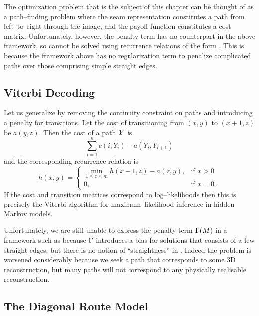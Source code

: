 The optimization problem that is the subject of this chapter can be
thought of as a path--finding problem where the seam representation
constitutes a path from left--to--right through the image, and the
payoff function constitutes a cost matrix. Unfortunately, however, the
penalty term has no counterpart in the above framework, so
 cannot be solved using recurrence relations of the
form . This is because the framework above has no
regularization term to penalize complicated paths over those
comprising simple straight edges.

\subsection{Viterbi Decoding}
Let us generalize  by removing the continuity
constraint on paths and introducing a penalty for transitions. Let the
cost of transitioning from $(x,y)$ to $(x+1,z)$ be $a(y,z)$. Then the
cost of a path $\vect{Y}$ is
\begin{equation}
  \label{eq:viterbi-cost}
  \sum_{i=1}^n c(i,Y_i) - a(Y_i,Y_{i+1})
\end{equation}
and the corresponding recurrence relation is
\begin{equation}
  \label{eq:viterbi-recurrence}
  h(x,y) = 
  \begin{cases}
    \min_{1\leq z\leq m}\limits h(x-1,z) - a(z,y),& \mbox{if } x>0\\
    0,& \mbox{if } x=0 ~.
  \end{cases}
\end{equation}
If the cost and transition matrices correspond to log--likelihoods
then this is precisely the Viterbi algorithm for maximum--likelihood
inference in hidden Markov models.

Unfortunately, we are still unable to express the penalty term
$\ScenePenalty(\Scene)$ in a framework such as
 because $\ScenePenalty$ introduces a bias
for solutions that consists of a few straight edges, but there is no
notion of ``straightness'' in . Indeed the
problem is worsened considerably because we seek a path that
corresponds to some 3D reconstruction, but many paths will not
correspond to any physically realisable reconstruction.

\subsection{The Diagonal Route Model}

